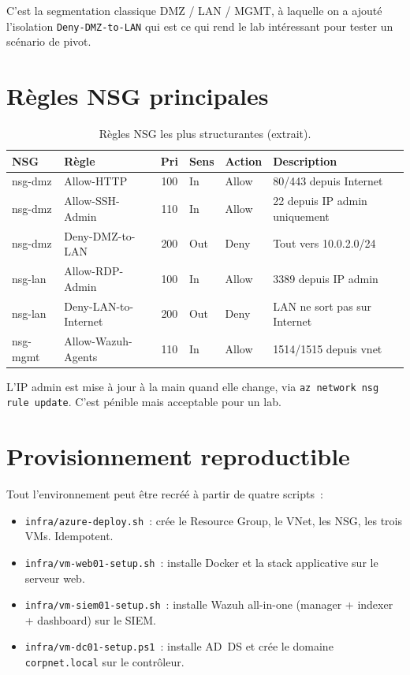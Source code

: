 C'est la segmentation classique DMZ / LAN / MGMT, à laquelle on a
ajouté l'isolation \texttt{Deny-DMZ-to-LAN} qui est ce qui rend
le lab intéressant pour tester un scénario de pivot.

\section{Règles NSG principales}

\begin{table}[h]
\centering
\caption{Règles NSG les plus structurantes (extrait).}
\label{tab:nsg}
\small
\begin{tabularx}{\textwidth}{llcllX}
\toprule
\textbf{NSG} & \textbf{Règle} & \textbf{Pri} & \textbf{Sens} & \textbf{Action} & \textbf{Description} \\
\midrule
nsg-dmz & Allow-HTTP & 100 & In & Allow & 80/443 depuis Internet \\
nsg-dmz & Allow-SSH-Admin & 110 & In & Allow & 22 depuis IP admin uniquement \\
nsg-dmz & Deny-DMZ-to-LAN & 200 & Out & Deny & Tout vers 10.0.2.0/24 \\
nsg-lan & Allow-RDP-Admin & 100 & In & Allow & 3389 depuis IP admin \\
nsg-lan & Deny-LAN-to-Internet & 200 & Out & Deny & LAN ne sort pas sur Internet \\
nsg-mgmt & Allow-Wazuh-Agents & 110 & In & Allow & 1514/1515 depuis vnet \\
\bottomrule
\end{tabularx}
\end{table}

L'IP admin est mise à jour à la main quand elle change, via
\texttt{az network nsg rule update}. C'est pénible mais
acceptable pour un lab.

\section{Provisionnement reproductible}

Tout l'environnement peut être recréé à partir de quatre scripts~:

\begin{itemize}
  \item \texttt{infra/azure-deploy.sh}~: crée le Resource Group,
    le VNet, les NSG, les trois VMs. Idempotent.
  \item \texttt{infra/vm-web01-setup.sh}~: installe Docker et la
    stack applicative sur le serveur web.
  \item \texttt{infra/vm-siem01-setup.sh}~: installe Wazuh
    all-in-one (manager + indexer + dashboard) sur le SIEM.
  \item \texttt{infra/vm-dc01-setup.ps1}~: installe AD~DS et
    crée le domaine \texttt{corpnet.local} sur le contrôleur.
\end{itemize}


